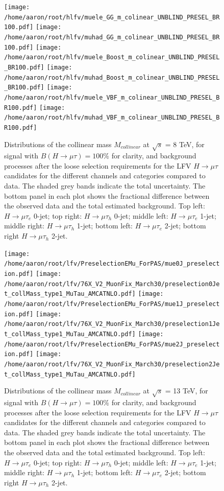 \documentclass[oneside, letterpaper, oldfontcommands]{memoir}
\begin{document}
\begin{figure}[hbtp]\centering
 \texttt{[image: /home/aaron/root/hlfv/muele\_GG\_m\_colinear\_UNBLIND\_PRESEL\_BR100.pdf]}
 \texttt{[image: /home/aaron/root/hlfv/muhad\_GG\_m\_colinear\_UNBLIND\_PRESEL\_BR100.pdf]}
 \texttt{[image: /home/aaron/root/hlfv/muele\_Boost\_m\_colinear\_UNBLIND\_PRESEL\_BR100.pdf]}
 \texttt{[image: /home/aaron/root/hlfv/muhad\_Boost\_m\_colinear\_UNBLIND\_PRESEL\_BR100.pdf]}
 \texttt{[image: /home/aaron/root/hlfv/muele\_VBF\_m\_colinear\_UNBLIND\_PRESEL\_BR100.pdf]}
 \texttt{[image: /home/aaron/root/hlfv/muhad\_VBF\_m\_colinear\_UNBLIND\_PRESEL\_BR100.pdf]}
 \caption{Distributions of the collinear mass $M_{collinear}$ at $\sqrt{s}$ = 8 TeV, for signal with $B(H \rightarrow \mu \tau )=100\%$ for clarity, and background processes after the loose selection requirements for the LFV $H \rightarrow \mu \tau$ candidates for the different channels and categories compared to data. The shaded grey bands indicate the total uncertainty. The bottom panel in each plot shows the fractional difference between the observed data and the total estimated background.  Top left: $H \rightarrow \mu \tau_{e}$ 0-jet; top right: $H \rightarrow \mu \tau_{h}$ 0-jet;  middle left: $H \rightarrow \mu \tau_{e}$ 1-jet; middle right: $H \rightarrow \mu \tau_{h}$
1-jet; bottom left: $H \rightarrow \mu \tau_{e}$ 2-jet; bottom right $H \rightarrow \mu \tau_{h}$ 2-jet. }
 \label{fig:Mcol_after_presel_WITHDATA}\end{figure}

\begin{figure}[hbtp]\centering
 \texttt{[image: /home/aaron/root/lfv/PreselectionEMu\_ForPAS/mue0J\_preselection.pdf]}
 \texttt{[image: /home/aaron/root/lfv/76X\_V2\_MuonFix\_March30/preselection0Jet\_collMass\_type1\_MuTau\_AMCATNLO.pdf]}
 \texttt{[image: /home/aaron/root/lfv/PreselectionEMu\_ForPAS/mue1J\_preselection.pdf]}
 \texttt{[image: /home/aaron/root/lfv/76X\_V2\_MuonFix\_March30/preselection1Jet\_collMass\_type1\_MuTau\_AMCATNLO.pdf]}
 \texttt{[image: /home/aaron/root/lfv/PreselectionEMu\_ForPAS/mue2J\_preselection.pdf]}
 \texttt{[image: /home/aaron/root/lfv/76X\_V2\_MuonFix\_March30/preselection2Jet\_collMass\_type1\_MuTau\_AMCATNLO.pdf]}
 \caption{Distributions of the collinear mass $M_{collinear}$ at $\sqrt{s}$ = 13 TeV, for signal with $B(H \rightarrow \mu \tau )=100\%$ for clarity, and background processes after the loose selection requirements for the LFV $H \rightarrow \mu \tau$ candidates for the different channels and categories compared to data. The shaded grey bands indicate the total uncertainty. The bottom panel in each plot shows the fractional difference between the observed data and the total estimated background.  Top left: $H \rightarrow \mu \tau_{e}$ 0-jet; top right: $H \rightarrow \mu \tau_{h}$ 0-jet;  middle left: $H \rightarrow \mu \tau_{e}$ 1-jet; middle right: $H \rightarrow \mu \tau_{h}$
1-jet; bottom left: $H \rightarrow \mu \tau_{e}$ 2-jet; bottom right $H \rightarrow \mu \tau_{h}$ 2-jet. }
 \label{fig:Mcol_after_presel_WITHDATA_13TeV}\end{figure}
\end{document}
